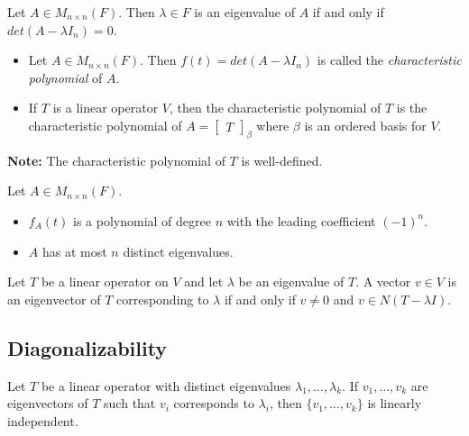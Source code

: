 \documentclass[12pt]{article}
\newenvironment{theorem}[2][Theorem]{\begin{trivlist}
\item[\hskip \labelsep {\bfseries #1}\hskip \labelsep {\bfseries #2.}]}{\end{trivlist}}
\newenvironment{definition}[2][Definition]{\begin{trivlist}
\item[\hskip \labelsep {\bfseries #1}\hskip \labelsep {\bfseries #2}]}{\end{trivlist}}
\begin{document}
\begin{theorem}{5.2}
Let $A \in M_{n \times n}(F)$. Then $\lambda \in F$ is an eigenvalue of $A$ if and only if $det(A - \lambda I_n) = 0$.
\end{theorem}

\begin{definition}{3} \text{ }
\begin{itemize}
    \item Let $A \in M_{n \times n}(F)$. Then $f(t) = det(A - \lambda I_n)$ is called the \textit{characteristic polynomial} of $A$.
    
    \item If $T$ is a linear operator $V$, then the characteristic polynomial of $T$ is the characteristic polynomial of $A = \begin{bmatrix} T \end{bmatrix}_\beta$ where $\beta$ is an ordered basis for $V$.
\end{itemize}
\end{definition}

\noindent\textbf{Note:} The characteristic polynomial of $T$ is well-defined.

\begin{theorem}{5.3}
Let $A \in M_{n \times n}(F)$.

\begin{itemize}
    \item $f_A(t)$ is a polynomial of degree $n$ with the leading coefficient $(-1)^n$.
    
    \item $A$ has at most $n$ distinct eigenvalues.
\end{itemize}
\end{theorem}

\begin{theorem}{5.4}
Let $T$ be a linear operator on $V$ and let $\lambda$ be an eigenvalue of $T$. A vector $v \in V$ is an eigenvector of $T$ corresponding to $\lambda$ if and only if $v \neq 0$ and $v \in N(T - \lambda I)$.
\end{theorem}

\subsection{Diagonalizability}

\begin{theorem}{5.5}
Let $T$ be a linear operator with distinct eigenvalues $\lambda_1, \dots, \lambda_k$. If $v_1, \dots, v_k$ are eigenvectors of $T$ such that $v_i$ corresponds to $\lambda_i$, then $\{v_1, \dots, v_k\}$ is linearly independent. 
\end{theorem}
\end{document}

